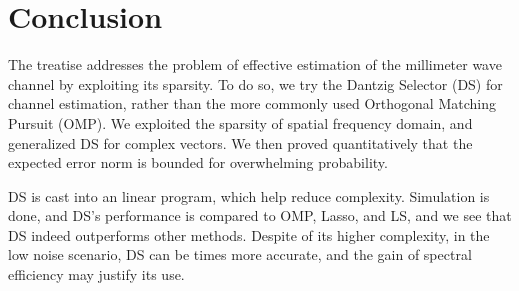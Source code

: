 
\chapter {Conclusion}

The treatise addresses the problem of effective estimation of the millimeter wave channel by exploiting its sparsity.
To do so, we try the Dantzig Selector (DS) for channel estimation, rather than the more commonly used Orthogonal Matching Pursuit (OMP).
We exploited the sparsity of spatial frequency domain, and generalized DS for complex vectors.
We then proved quantitatively that the expected error norm is bounded for overwhelming probability.

DS is cast into an linear program, which help reduce complexity.
Simulation is done, and DS's performance is compared to OMP, Lasso, and LS, and we see that DS indeed outperforms other methods.
Despite of its higher complexity, in the low noise scenario, DS can be  times more accurate, and the gain of spectral efficiency may justify its use.
